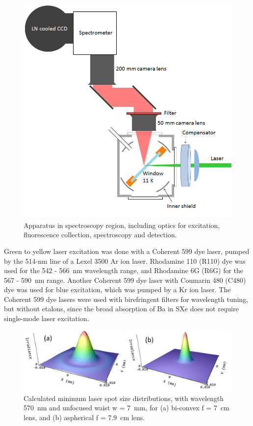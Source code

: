 \begin{figure} %
        \centering
                \includegraphics[width=.7\textwidth]{figures/window_etc_justOptics.png}
                \caption{Apparatus in spectroscopy region, including optics for excitation, fluorescence collection, spectroscopy and detection.}
\label{fig:endOfBeamOptics}
\end{figure}

Green to yellow laser excitation was done with a Coherent 599 dye laser, pumped by the 514-nm line of a Lexel 3500 Ar ion laser.  Rhodamine 110 (R110) dye was used for the 542 - 566~nm wavelength range, and Rhodamine 6G (R6G) for the 567 - 590~nm range.  Another Coherent 599 dye laser with Coumarin 480 (C480) dye was used for blue excitation, which was pumped by a Kr ion laser.  The Coherent 599 dye lasers were used with birefringent filters for wavelength tuning, but without etalons, since the broad absorption of Ba in SXe does not require single-mode laser excitation.

\begin{figure} %
        \centering
                \includegraphics[width=.7\textwidth]{figures/DFairbank_aber.png}
                \caption{Calculated minimum laser spot size distributions, with wavelength 570~nm and unfocused waist w = 7~mm, for (a) bi-convex f = 7~cm lens, and (b) aspherical f = 7.9~cm lens.}
\label{fig:DFairbank}
\end{figure}

